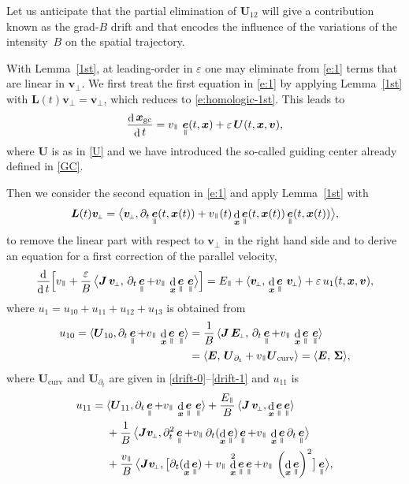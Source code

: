 \documentclass[10pt]{amsart}
\newcommand{\sperp}{{\scriptscriptstyle\perp}}
\newcommand{\blangle}{\bigl\langle}
\newcommand{\brangle}{\bigr\rangle}
\let\eps\varepsilon
\let\d\partial
\DeclareMathOperator\dD{d}\let\dd\dD
\theoremstyle{plain}
\theoremstyle{definition}
\newcommand{\be}{\begin{equation}}
\newcommand{\ee}{\end{equation}}
\newcommand\bE{{\boldsymbol E}}
\newcommand\bJ{{\boldsymbol J}}
\newcommand\bL{{\boldsymbol L}}
\newcommand\bU{{\boldsymbol U}}
\newcommand\bfv{{\boldsymbol v}}
\newcommand\bfx{{\boldsymbol x}}
\newcommand\Sig{{\boldsymbol \Sigma}}
\DeclareMathOperator{\beD}{\boldsymbol{e}}
\newcommand\eDpar{\beD_\mypar}
\newcommand\vpar{v_\mypar}
\newcommand\bvperp{\bfv_{\!\sperp}}
\newcommand\Epar{E_\mypar}
\newcommand\Eperp{\bE_{\!\sperp}}
\newcommand{\GC}{\bfx_\mathrm{gc}}
\newcommand{\curvB}{\bU_{\mathrm{curv}}}
\newcommand{\dtB}{\bU_{\d_t}}
\newcommand{\mypar}{{\mkern3mu\vphantom{\perp}\vrule depth 0pt\mkern2mu\vrule depth 0pt\mkern3mu}}
\begin{document}
Let us anticipate that the partial elimination of $\bU_{12}$ will give a contribution known as the grad-$B$ drift and that encodes the influence of the variations of the intensity~$B$ on the spatial trajectory.

With Lemma~\ref{1st}, at leading-order in $\eps$ one may eliminate from \eqref{e:1} terms that are linear in $\bvperp$. We first treat the first equation in \eqref{e:1} by applying Lemma~\ref{1st} with $\bL(t)\bvperp=\bvperp$, which reduces to \eqref{e:homologic-1st}. This leads to
\be\label{e:x}
\frac{\dD \GC}{\dD t}=\vpar\,\eDpar(t,\bfx) +\eps\,\bU(t,\bfx,\bfv),
\ee
where $\bU$ is as in \eqref{U} and we have introduced the so-called
guiding center already defined in \eqref{GC}.

Then we consider the
second equation in \eqref{e:1} and apply Lemma~\ref{1st} with
\[
\bL(t)\bvperp=\blangle\bvperp,\d_t\eDpar(t,\bfx(t))+\vpar(t)\dD_{\bfx}\eDpar(t,\bfx(t))\eDpar(t,\bfx(t))\brangle,
\]
to remove the linear part with respect to $\bvperp$ in the right hand
side and to derive an equation for a first correction of the parallel velocity,
\begin{align}
\label{e:vp}
\frac{\dD }{\dD t}\Bigl[\vpar
+\frac{\eps}{B}\,\blangle\bJ\,\bvperp,\,\d_t\eDpar+\vpar\,\dD_{\bfx}\eDpar\,\eDpar\brangle\Bigr] =\Epar+\langle\bvperp,\,\dD_{\bfx}\eDpar\,\bvperp\rangle
+\eps \,u_1(t,\bfx,\bfv),
\end{align}
where $u_1=u_{10}+u_{11}+u_{12}+u_{13}$ is obtained from
\begin{align*}
u_{10}=\langle\bU_{10},\d_t\eDpar+\vpar\,\dD_{\bfx}\eDpar\,\eDpar\rangle&=\frac{1}{B}\,\langle {\bJ}\,\Eperp,\,\d_t\eDpar+\vpar\,\dD_{\bfx}\eDpar\,\eDpar\rangle
\\
&= \langle \bE,\, \dtB + \vpar \curvB\rangle
=\langle \bE,\,\Sig\rangle,
\end{align*}
where $\curvB$ and $\dtB$ are given in \eqref{drift-0}--\eqref{drift-1} and $u_{11}$ is
\begin{align*}
 u_{11} ={}&\langle \bU_{11},
\d_t\eDpar+\vpar\,\dD_{\bfx}\eDpar\,\eDpar\rangle
+\frac{\Epar}{B}\,\langle {\bJ}\,\bvperp, \dD_{\bfx}\eDpar\eDpar\rangle
\\
&+\frac{1}{B}\, \blangle
\bJ\bvperp,\d_t^2\eDpar+\vpar\,\d_t(\dD_{\bfx}\eDpar)\eDpar+\vpar\,\dD_{\bfx}\eDpar\d_t\eDpar\brangle
\\
&+\frac{\vpar}{B}\, \blangle
\bJ\bvperp,\bigl[\d_t(\dD_\bfx\eDpar)+\vpar\,\dD_{\bfx}^2\eDpar\eDpar+\vpar\,\left(\dD_{\bfx}\eDpar\right)^2\bigr]\eDpar\brangle,
\end{align*}
\end{document}
